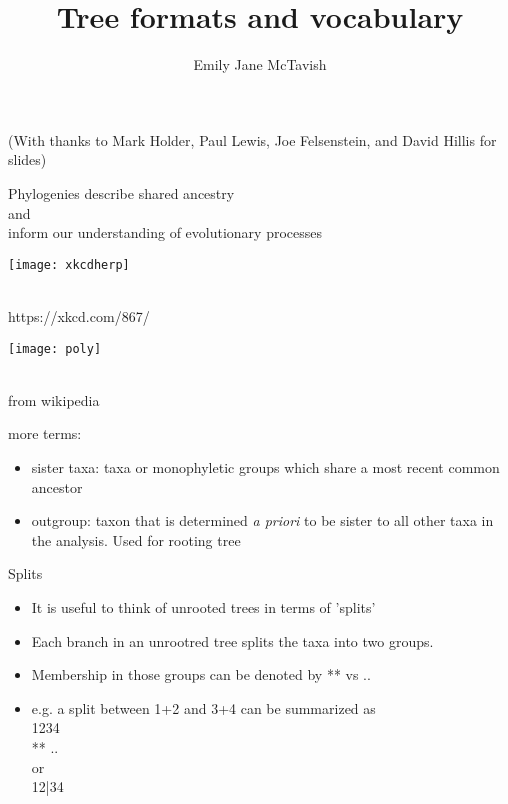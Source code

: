 \documentclass{beamer}
\title[*]{Tree formats and vocabulary}
\author[*]{Emily Jane McTavish}
\institute[*]{
Life and Environmental Sciences\\
University of California, Merced\\
\texttt{ejmctavish@ucmerced.edu, twitter:snacktavish}\\
}
\date{}
\begin{document}
\begin{frame}
\titlepage
(With thanks to Mark Holder, Paul Lewis, Joe Felsenstein, and David Hillis for slides) 
\end{frame}



\begin{frame}
\begin{center}
 \Large{Phylogenies describe shared ancestry\\
and\\
inform our understanding of evolutionary processes}
\end{center}
\end{frame}





\begin{frame}
\begin{centering}
\texttt{[image: xkcdherp]}
\end{centering}\\
https://xkcd.com/867/
\end{frame}



\begin{frame}
\begin{centering}
\texttt{[image: poly]}
\end{centering}\\
from wikipedia
\end{frame}


\begin{frame}
more terms:
\begin{itemize}
 \item sister taxa: taxa or monophyletic groups which share a most recent common ancestor
 \item outgroup: taxon that is determined \emph{a priori} to be sister to all other taxa in the analysis. Used for rooting tree
\end{itemize}

\end{frame}



\begin{frame}
Splits\\
\begin{itemize}
 \item It is useful to think of unrooted trees in terms of 'splits'
 \item Each branch in an unrootred tree splits the taxa into two groups.
 \item Membership in those groups can be denoted by ** vs .. 
 \item e.g. a split between 1+2 and 3+4 can be summarized as\\
 1234\\ 
 ** ..\\
  or\\
12|34
\end{itemize}
\end{frame}
\end{document}
